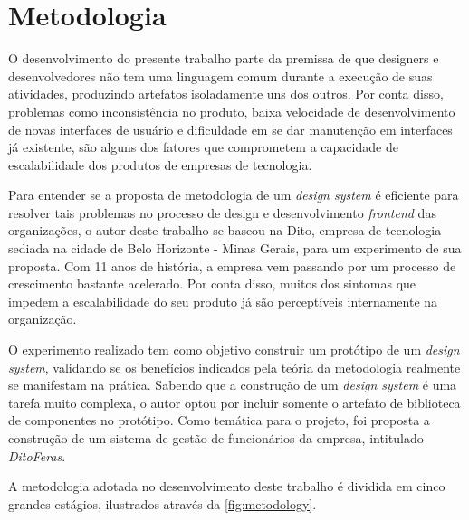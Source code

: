
\chapter{Metodologia}
\label{chap:metodologia}

O desenvolvimento do presente trabalho parte da premissa de que designers e desenvolvedores não tem uma linguagem comum durante a execução de suas atividades, produzindo artefatos isoladamente uns dos outros. Por conta disso, problemas como inconsistência no produto, baixa velocidade de desenvolvimento de novas interfaces de usuário e dificuldade em se dar manutenção em interfaces já existente, são alguns dos fatores que comprometem a capacidade de escalabilidade dos produtos de empresas de tecnologia.

Para entender se a proposta de metodologia de um \textit{design system} é eficiente para resolver tais problemas no processo de design e desenvolvimento \textit{frontend} das organizações, o autor deste trabalho se baseou na Dito, empresa de tecnologia sediada na cidade de Belo Horizonte - Minas Gerais, para um experimento de sua proposta. Com 11 anos de história, a empresa vem passando por um processo de crescimento bastante acelerado. Por conta disso, muitos dos sintomas que impedem a escalabilidade do seu produto já são perceptíveis internamente na organização. 

O experimento realizado tem como objetivo construir um protótipo de um \textit{design system}, validando se os benefícios indicados pela teória da metodologia realmente se manifestam na prática. Sabendo que a construção de um \textit{design system} é uma tarefa muito complexa, o autor optou por incluir somente o artefato de biblioteca de componentes no protótipo. Como temática para o projeto, foi proposta a construção de um sistema de gestão de funcionários da empresa, intitulado \textit{DitoFeras}.

A metodologia adotada no desenvolvimento deste trabalho é dividida em cinco grandes estágios, ilustrados através da \autoref{fig:metodology}.

